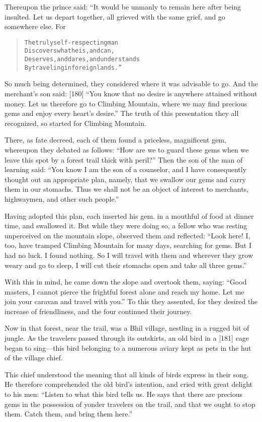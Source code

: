 \documentclass[article, twoside, 14pt]{memoir}
\renewenvironment{verbatim}{%
\begin{quote}%
\vskip -10pt%
\begin{alltt}\normalfont\large}{\end{alltt}%
\end{quote}%
\vskip -10pt
} %
\begin{document}
Thereupon the prince said: “It would be unmanly to remain here
after being insulted. Let us depart together, all grieved with the
same grief, and go somewhere else. For

\begin{verbatim}
The truly self-respecting man
Discovers what he is, and can,
Deserves, and dares, and understands
By traveling in foreign lands.”
\end{verbatim}
So much being determined, they considered where it was advisable to
go. And the merchant's son said: [180]
``You know that no desire is anywhere attained without money. Let us therefore go to Climbing Mountain, where we may find precious gems and enjoy every heart's desire.''
The truth of this presentation they all recognized, so started for
Climbing Mountain.

There, as fate decreed, each of them found a priceless, magnificent
gem, whereupon they debated as follows:
``How are we to guard these gems when we leave this spot by a forest trail thick with peril?''
Then the son of the man of learning said:
``You know I am the son of a counselor, and I have consequently thought out an appropriate plan, namely, that we swallow our gems and carry them in our stomachs. Thus we shall not be an object of interest to merchants, highwaymen, and other such people.''

Having adopted this plan, each inserted his gem. in a mouthful of
food at dinner time, and swallowed it. But while they were doing
so, a fellow who was resting unperceived on the mountain slope,
observed them and reflected:
``Look here! I, too, have tramped Climbing Mountain for many days, searching for gems. But I had no luck. I found nothing. So I will travel with them and wherever they grow weary and go to sleep, I will cut their stomachs open and take all three gems.''

With this in mind, he came down the slope and overtook them,
saying:
``Good masters, I cannot pierce the frightful forest alone and reach my home. Let me join your caravan and travel with you.''
To this they assented, for they desired the increase of
friendliness, and the four continued their journey.

Now in that forest, near the trail, was a Bhil village, nestling in
a rugged bit of jungle. As the travelers passed through its
outskirts, an old bird in a [181] cage began to sing---this bird
belonging to a numerous aviary kept as pets in the hut of the
village chief.

This chief understood the meaning that all kinds of birds express
in their song. He therefore comprehended the old bird's intention,
and cried with great delight to his men:
``Listen to what this bird tells us. He says that there are precious gems in the possession of yonder travelers on the trail, and that we ought to stop them. Catch them, and bring them here.''
\end{document}
